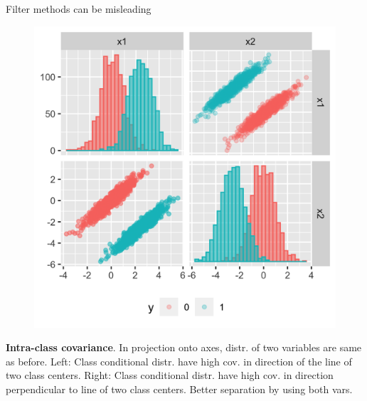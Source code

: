\documentclass[11pt,compress,t,notes=noshow, xcolor=table]{beamer}
\begin{document}
\begin{vbframe}{Filter methods can be misleading}
\begin{figure}
\begin{minipage}{0.45\textwidth}
        \includegraphics[width=\textwidth]{figure/guyon_example_intra_class_covariance_perpendicular.png} %
    \end{minipage}
    \end{figure}
\vspace{0.3cm}
\footnotesize{\textbf{Intra-class covariance}. In projection onto axes, distr. of two variables are same as before. Left: Class conditional distr. have high cov. in direction of the line of two class centers. Right: Class conditional distr. have high cov. in direction perpendicular to line of two class centers. Better separation by using both vars.}

 \framebreak



\end{vbframe}
\end{document}
